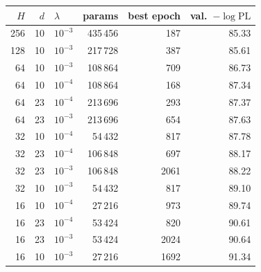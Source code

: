 \begin{tabular}{rrlrrr}
\toprule
$H$ & $d$ & $\lambda$ & params & best epoch & val.\ $-\log\mathrm{PL}$ \\
\midrule
256 & 10 & $10^{-3}$ & 435\,456 & 187 & 85.33 \\
128 & 10 & $10^{-3}$ & 217\,728 & 387 & 85.61 \\
64 & 10 & $10^{-3}$ & 108\,864 & 709 & 86.73 \\
64 & 10 & $10^{-4}$ & 108\,864 & 168 & 87.34 \\
64 & 23 & $10^{-4}$ & 213\,696 & 293 & 87.37 \\
64 & 23 & $10^{-3}$ & 213\,696 & 654 & 87.63 \\
32 & 10 & $10^{-4}$ & 54\,432 & 817 & 87.78 \\
32 & 23 & $10^{-4}$ & 106\,848 & 697 & 88.17 \\
32 & 23 & $10^{-3}$ & 106\,848 & 2061 & 88.22 \\
32 & 10 & $10^{-3}$ & 54\,432 & 817 & 89.10 \\
16 & 10 & $10^{-4}$ & 27\,216 & 973 & 89.74 \\
16 & 23 & $10^{-4}$ & 53\,424 & 820 & 90.61 \\
16 & 23 & $10^{-3}$ & 53\,424 & 2024 & 90.64 \\
16 & 10 & $10^{-3}$ & 27\,216 & 1692 & 91.34 \\
\bottomrule
\end{tabular}